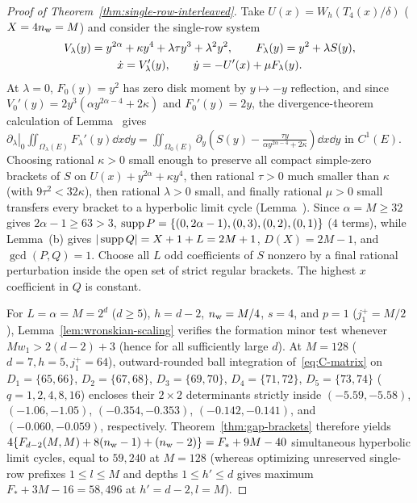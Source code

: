 \begin{proof}[Proof of Theorem~\ref{thm:single-row-interleaved}]
Take $U(x)=W_h(T_4(x)/\delta)$ ($X=4n_{\rm w}=M$) and consider the single-row system
\begin{gather}
  V_\lambda(y) = y^{2\alpha} + \kappa y^4 + \lambda\tau y^3 + \lambda^2 y^2, \qquad
  F_\lambda(y) = y^2 + \lambda S(y), \notag\\
  \dot{x} = V_\lambda'(y), \qquad \dot{y} = -U'(x) + \mu F_\lambda(y).\label{eq:1row-physical}
\end{gather}
At $\lambda=0$, $F_0(y)=y^2$ has zero disk moment by $y\mapsto -y$ reflection, and since $V_0'(y)=2y^3(\alpha y^{2\alpha-4}+2\kappa)$ and $F_0'(y)=2y$, the divergence-theorem calculation of Lemma~ gives $\left.\partial_\lambda\right|_0\iint_{\Omega_\lambda(E)}F_\lambda'(y)\dd x\dd y = \iint_{\Omega_0(E)}\partial_y(S(y)-\frac{\tau y}{\alpha y^{2\alpha-4}+2\kappa})\dd x\dd y$ in $C^1(E)$. Choosing rational $\kappa>0$ small enough to preserve all compact simple-zero brackets of $S$ on $U(x)+y^{2\alpha}+\kappa y^4$, then rational $\tau>0$ much smaller than $\kappa$ (with $9\tau^2<32\kappa$), then rational $\lambda>0$ small, and finally rational $\mu>0$ small transfers every bracket to a hyperbolic limit cycle (Lemma~). Since $\alpha=M\ge 32$ gives $2\alpha-1\ge 63>3$, $\operatorname{supp} P=\{(0,2\alpha-1),(0,3),(0,2),(0,1)\}$ ($4$ terms), while Lemma~(b) gives $|\operatorname{supp} Q|=X+1+L=2M+1$, $D(X)=2M-1$, and $\gcd(P,Q)=1$. Choose all $L$ odd coefficients of $S$ nonzero by a final rational perturbation inside the open set of strict regular brackets. The highest $x$ coefficient in $Q$ is constant.

For $L=\alpha=M=2^d$ ($d\ge 5$), $h=d-2$, $n_{\rm w}=M/4$, $s=4$, and $p=1$ ($j_1^+=M/2$), Lemma~\ref{lem:wronskian-scaling} verifies the formation minor test whenever $M w_1>2(d-2)+3$ (hence for all sufficiently large $d$). At $M=128$ ($d=7,h=5,j_1^+=64$), outward-rounded ball integration of~\eqref{eq:C-matrix} on $D_1=\{65,66\}$, $D_2=\{67,68\}$, $D_3=\{69,70\}$, $D_4=\{71,72\}$, $D_5=\{73,74\}$ ($q=1,2,4,8,16$) encloses their $2\times 2$ determinants strictly inside $(-5.59,-5.58)$, $(-1.06,-1.05)$, $(-0.354,-0.353)$, $(-0.142,-0.141)$, and $(-0.060,-0.059)$, respectively. Theorem~\ref{thm:gap-brackets} therefore yields $4\{F_{d-2}(M,M)+8(n_{\rm w}-1)+(n_{\rm w}-2)\}=F_*+9M-40$ simultaneous hyperbolic limit cycles, equal to $59{,}240$ at $M=128$ (whereas optimizing unreserved single-row prefixes $1\le l\le M$ and depths $1\le h'\le d$ gives maximum $F_*+3M-16=58{,}496$ at $h'=d-2,l=M$).
\end{proof}

